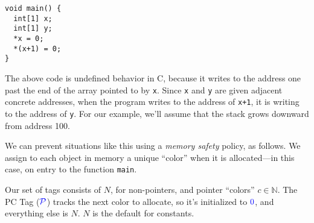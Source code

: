 \documentclass{llncs}
\begin{document}
\begin{verbatim}
void main() {
  int[1] x;
  int[1] y;
  *x = 0;
  *(x+1) = 0;
}
\end{verbatim}

The above code is undefined behavior in C, because it writes to the address one past the end
of the array pointed to by {\tt x}. Since
{\tt x} and {\tt y} are given adjacent concrete addresses, when the program
writes to the address of {\tt x+1}, it is writing to the address of {\tt y}.
For our example, we'll assume that the stack grows downward from address 100.

We can prevent situations like this using a {\em memory safety} policy, as follows.
We assign to each object in memory a unique ``color'' when it is allocated---in this case,
on entry to the function {\tt main}.

Our set of tags consists of
\(N\), for non-pointers, and pointer ``colors'' \(c \in \mathbb{N}\). The PC Tag
(\(\mathcal{\color{blue} P}\)) tracks the next color to allocate, so it's initialized to \({\color{blue} 0}\), and everything else is \(N\).
\(N\) is the default for constants.
\end{document}
